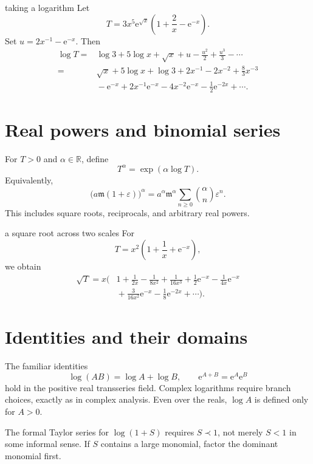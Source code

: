\documentclass[11pt,openany]{book}
\theoremstyle{plain}
\theoremstyle{definition}
\theoremstyle{remark}
\newcommand{\R}{\mathbb{R}}
\newcommand{\m}{\mathfrak{m}}
\newcommand{\e}{\mathrm{e}}
\begin{document}
\begin{workedbox}{taking a logarithm}
Let
\[
  T=3x^5\e^{\sqrt{x}}
  \left(1+\frac2x-\e^{-x}\right).
\]
Set $u=2x^{-1}-\e^{-x}$. Then
\begin{align*}
  \log T
  ={}&\log3+5\log x+\sqrt{x}
       +u-\frac{u^2}{2}+\frac{u^3}{3}-\cdots\\
  ={}&\sqrt{x}+5\log x+\log3
       +2x^{-1}-2x^{-2}+\frac{8}{3}x^{-3}\\
     &{}-\e^{-x}+2x^{-1}\e^{-x}
       -4x^{-2}\e^{-x}-\frac12\e^{-2x}+\cdots.
\end{align*}
\end{workedbox}

\section{Real powers and binomial series}
For $T>0$ and $\alpha\in\R$, define
\[
  T^\alpha=\exp(\alpha\log T).
\]
Equivalently,
\[
  \bigl(a\m(1+\varepsilon)\bigr)^\alpha
  =a^\alpha\m^\alpha
   \sum_{n\ge0}\binom{\alpha}{n}\varepsilon^n.
\]
This includes square roots, reciprocals, and arbitrary real powers.

\begin{workedbox}{a square root across two scales}
For
\[
  T=x^2\left(1+\frac1x+\e^{-x}\right),
\]
we obtain
\begin{align*}
  \sqrt{T}
  =x\biggl(&1+\frac{1}{2x}-\frac{1}{8x^2}
  +\frac{1}{16x^3}
  +\frac12\e^{-x}-\frac{1}{4x}\e^{-x}\\
  &{}+\frac{3}{16x^2}\e^{-x}
  -\frac18\e^{-2x}+\cdots\biggr).
\end{align*}
\end{workedbox}

\section{Identities and their domains}
The familiar identities
\[
  \log(AB)=\log A+\log B,
  \qquad
  \e^{A+B}=\e^A\e^B
\]
hold in the positive real transseries field. Complex logarithms require branch choices, exactly as in complex analysis. Even over the reals, $\log A$ is defined only for $A>0$.

\begin{warningbox}
The formal Taylor series for $\log(1+S)$ requires $S\prec1$, not merely $S<1$ in some informal sense. If $S$ contains a large monomial, factor the dominant monomial first.
\end{warningbox}
\end{document}
